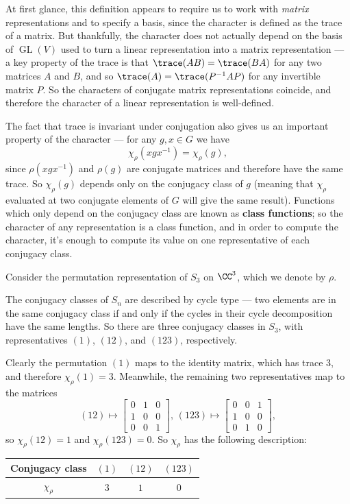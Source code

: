 At first glance, this definition appears to require us to work with \emph{matrix} representations and to specify a basis, since the character is defined as the trace of a matrix. But thankfully, the character does not actually depend on the basis of $\operatorname{GL}(V)$ used to turn a linear representation into a matrix representation --- a key property of the trace is that $\trace(AB) = \trace(BA)$ for any two matrices $A$ and $B$, and so $\trace(A) = \trace(P^{-1}AP)$ for any invertible matrix $P$. So the characters of conjugate matrix representations coincide, and therefore the character of a linear representation is well-defined. 

The fact that trace is invariant under conjugation also gives us an important property of the character --- for any $g, x \in G$ we have \[\chi_\rho(xgx^{-1}) = \chi_\rho(g),\] since $\rho(xgx^{-1})$ and $\rho(g)$ are conjugate matrices and therefore have the same trace. So $\chi_\rho(g)$ depends only on the conjugacy class of $g$ (meaning that $\chi_\rho$ evaluated at two conjugate elements of $G$ will give the same result). Functions which only depend on the conjugacy class are known as \textbf{class functions}; so the character of any representation is a class function, and in order to compute the character, it's enough to compute its value on one representative of each conjugacy class. 
 
\begin{example}
Consider the permutation representation of $S_3$ on $\CC^3$, which we denote by $\rho$. 

The conjugacy classes of $S_n$ are described by cycle type --- two elements are in the same conjugacy class if and only if the cycles in their cycle decomposition have the same lengths. So there are three conjugacy classes in $S_3$, with representatives $(1)$, $(12)$, and $(123)$, respectively. 

Clearly the permutation $(1)$ maps to the identity matrix, which has trace $3$, and therefore $\chi_\rho(1) = 3$. Meanwhile, the remaining two representatives map to the matrices 
\[
     (12) \mapsto \begin{bmatrix} 0 & 1 & 0 \\ 1 & 0 & 0 \\ 0 & 0 & 1 \end{bmatrix}, \, (123) \mapsto \begin{bmatrix} 0 & 0 & 1 \\ 1 & 0 & 0 \\ 0 & 1 & 0 \end{bmatrix},
 \]
 so $\chi_\rho(12) = 1$ and $\chi_\rho(123) = 0$. So $\chi_\rho$ has the following description:
 
 \begin{center}
     \begin{tabular}{c|c|c|c}
        Conjugacy class & $(1)$ & $(12)$ & $(123)$ \\
         \hline 
        $\chi_\rho$ & $3$ & $1$ & $0$
     \end{tabular}
 \end{center}
 \end{example}
 
